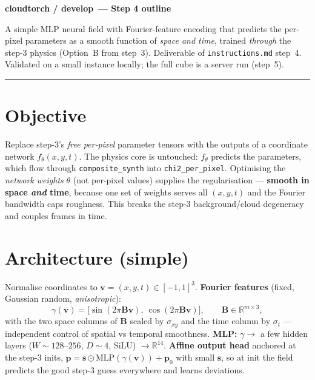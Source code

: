 \documentclass[10pt,a4paper]{article}
\newcommand{\co}[1]{{\small\texttt{#1}}}
\begin{document}
\small

{\sffamily\bfseries\large\color{acc} cloudtorch / develop\, --- Step 4 outline}

\vspace{1pt}
{\sffamily\color{gry}\footnotesize A simple MLP neural field with Fourier-feature encoding that predicts the per-pixel parameters as a smooth function of \emph{space and time}, trained \emph{through} the step-3 physics (Option~B from step~3). Deliverable of \co{instructions.md} step~4. Validated on a small instance locally; the full cube is a server run (step~5).}

\vspace{1pt}
{\footnotesize\color{gry}\rule{\textwidth}{0.4pt}}

\section{Objective}

Replace step-3's \emph{free per-pixel} parameter tensors with the outputs of a coordinate network $f_\theta(x,y,t)$. The physics core is untouched: $f_\theta$ predicts the parameters, which flow through \co{composite\_synth} into \co{chi2\_per\_pixel}. Optimising the \emph{network weights} $\theta$ (not per-pixel values) supplies the regularisation --- \textbf{smooth in space \emph{and} time}, because one set of weights serves all $(x,y,t)$ and the Fourier bandwidth caps roughness. This breaks the step-3 background/cloud degeneracy and couples frames in time.

\section{Architecture (simple)}

Normalise coordinates to $\mathbf v=(x,y,t)\in[-1,1]^3$. \textbf{Fourier features} (fixed, Gaussian random, \emph{anisotropic}):
\[
\gamma(\mathbf v)=\big[\sin(2\pi\mathbf B\mathbf v),\ \cos(2\pi\mathbf B\mathbf v)\big],\qquad \mathbf B\in\mathbb R^{m\times3},
\]
with the two space columns of $\mathbf B$ scaled by $\sigma_{xy}$ and the time column by $\sigma_t$ --- independent control of spatial vs temporal smoothness. \textbf{MLP:} $\gamma\!\rightarrow\!$ a few hidden layers ($W\!\sim\!128$--$256$, $D\!\sim\!4$, SiLU) $\rightarrow\mathbb R^{14}$. \textbf{Affine output head} anchored at the step-3 inits, $\mathbf p=\mathbf s\odot\mathrm{MLP}(\gamma(\mathbf v))+\mathbf p_0$ with small $\mathbf s$, so at init the field predicts the good step-3 guess everywhere and learns deviations.
\end{document}
